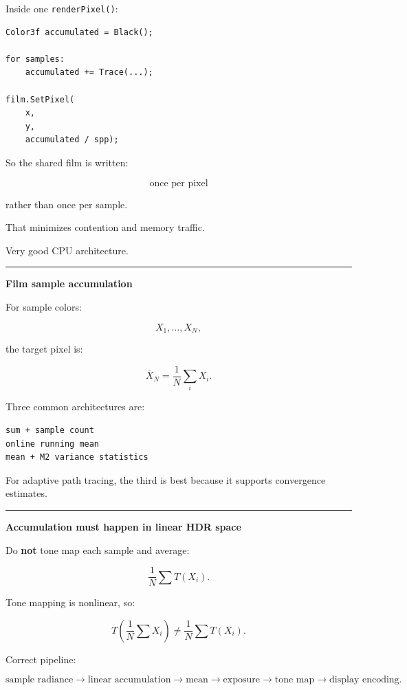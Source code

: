 Inside one \texttt{renderPixel()}:

\begin{verbatim}
Color3f accumulated = Black();

for samples:
    accumulated += Trace(...);

film.SetPixel(
    x,
    y,
    accumulated / spp);
\end{verbatim}

So the shared film is written:

\[
\boxed{\text{once per pixel}}
\]

rather than once per sample.

That minimizes contention and memory traffic.

Very good CPU architecture.

\begin{center}\rule{0.5\linewidth}{0.5pt}\end{center}

\textbf{Film sample accumulation}

For sample colors:

\[
X_1,\dots,X_N,
\]

the target pixel is:

\[
\bar X_N=
\frac1N
\sum_iX_i.
\]

Three common architectures are:

\begin{verbatim}
sum + sample count
online running mean
mean + M2 variance statistics
\end{verbatim}

For adaptive path tracing, the third is best because it supports convergence estimates.

\begin{center}\rule{0.5\linewidth}{0.5pt}\end{center}

\textbf{Accumulation must happen in linear HDR space}

Do \textbf{not} tone map each sample and average:

\[
\frac1N
\sum
T(X_i).
\]

Tone mapping is nonlinear, so:

\[
\boxed{
T\left(
\frac1N\sum X_i
\right)
\neq
\frac1N
\sum T(X_i).
}
\]

Correct pipeline:

\[
\boxed{
\text{sample radiance}
\rightarrow
\text{linear accumulation}
\rightarrow
\text{mean}
\rightarrow
\text{exposure}
\rightarrow
\text{tone map}
\rightarrow
\text{display encoding}.
}
\]

